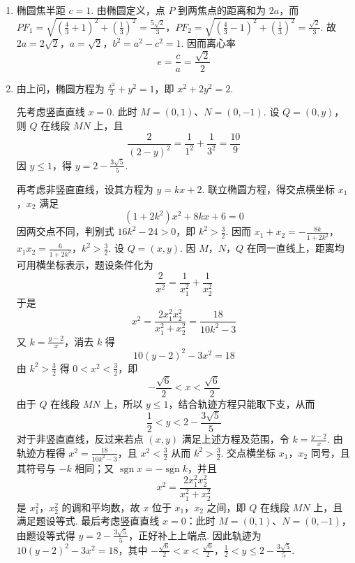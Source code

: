 \begin{solution}
\begin{enumerate}
\item 椭圆焦半距 \(c=1\). 由椭圆定义，点 \(P\) 到两焦点的距离和为 \(2a\)，而
\(PF_1=\sqrt{\left(\frac43+1\right)^2+\left(\frac13\right)^2}=\frac{5\sqrt2}{3}\)，\(PF_2=\sqrt{\left(\frac43-1\right)^2+\left(\frac13\right)^2}=\frac{\sqrt2}{3}\).
故 \(2a=2\sqrt2\)，\(a=\sqrt2\)，\(b^2=a^2-c^2=1\). 因而离心率
\[
e=\frac ca=\frac{\sqrt2}{2}
\]

\item 由上问，椭圆方程为 \(\frac{x^2}{2}+y^2=1\)，即 \(x^2+2y^2=2\).

先考虑竖直直线 \(x=0\). 此时 \(M=(0,1)\)、\(N=(0,-1)\). 设 \(Q=(0,y)\)，则 \(Q\) 在线段 \(MN\) 上，且
\[
\frac{2}{(2-y)^2}=\frac{1}{1^2}+\frac{1}{3^2}=\frac{10}{9}
\]
因 \(y\leqslant1\)，得 \(y=2-\frac{3\sqrt5}{5}\).

再考虑非竖直直线，设其方程为 \(y=kx+2\). 联立椭圆方程，得交点横坐标 \(x_1\)，\(x_2\) 满足
\[
(1+2k^2)x^2+8kx+6=0
\]
因两交点不同，判别式 \(16k^2-24>0\)，即 \(k^2>\frac32\). 因而
\(x_1+x_2=-\frac{8k}{1+2k^2}\)，\(x_1x_2=\frac{6}{1+2k^2}\)，\(k^2>\frac32\).
设 \(Q=(x,y)\). 因 \(M\)，\(N\)，\(Q\) 在同一直线上，距离均可用横坐标表示，题设条件化为
\[
\frac2{x^2}=\frac1{x_1^2}+\frac1{x_2^2}
\]
于是
\[
x^2=\frac{2x_1^2x_2^2}{x_1^2+x_2^2}
=\frac{18}{10k^2-3}
\]
又 \(k=\frac{y-2}{x}\)，消去 \(k\) 得
\[
10(y-2)^2-3x^2=18
\]
由 \(k^2>\frac32\) 得 \(0<x^2<\frac32\)，即
\[
-\frac{\sqrt6}{2}<x<\frac{\sqrt6}{2}
\]
由于 \(Q\) 在线段 \(MN\) 上，所以 \(y\leqslant1\)，结合轨迹方程只能取下支，从而
\[
\frac12<y<2-\frac{3\sqrt5}{5}
\]
对于非竖直直线，反过来若点 \((x,y)\) 满足上述方程及范围，令 \(k=\frac{y-2}{x}\). 由轨迹方程得 \(x^2=\frac{18}{10k^2-3}\)，且 \(x^2<\frac32\) 从而 \(k^2>\frac32\). 交点横坐标 \(x_1\)，\(x_2\) 同号，且其符号与 \(-k\) 相同；又 \(\operatorname{sgn}x=-\operatorname{sgn}k\)，并且
\[
x^2=\frac{2x_1^2x_2^2}{x_1^2+x_2^2}
\]
是 \(x_1^2\)，\(x_2^2\) 的调和平均数，故 \(x\) 位于 \(x_1\)，\(x_2\) 之间，即 \(Q\) 在线段 \(MN\) 上，且满足题设等式. 最后考虑竖直直线 \(x=0\)：此时 \(M=(0,1)\)、\(N=(0,-1)\)，由题设等式得 \(y=2-\frac{3\sqrt5}{5}\)，正好补上上端点. 因此轨迹为
\(10(y-2)^2-3x^2=18\)，其中 \(-\frac{\sqrt6}{2}<x<\frac{\sqrt6}{2}\)，\(\frac12<y\leqslant2-\frac{3\sqrt5}{5}\).
\end{enumerate}
\end{solution}


